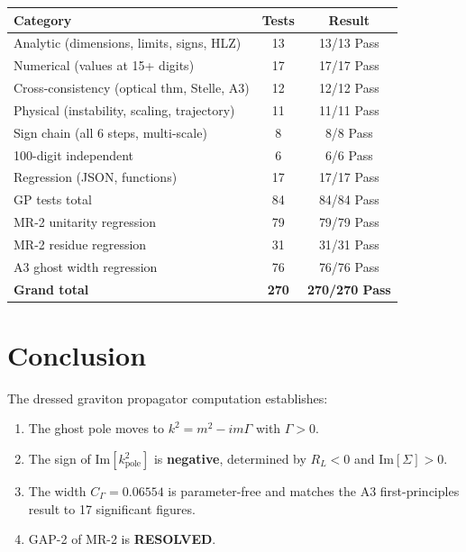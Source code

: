 \documentclass[11pt,a4paper]{article}
\newcommand{\Imag}{\mathrm{Im}}
\begin{document}
\begin{center}
\begin{tabular}{lcc}
\toprule
Category & Tests & Result \\
\midrule
Analytic (dimensions, limits, signs, HLZ) & 13 & 13/13 Pass \\
Numerical (values at 15+ digits) & 17 & 17/17 Pass \\
Cross-consistency (optical thm, Stelle, A3) & 12 & 12/12 Pass \\
Physical (instability, scaling, trajectory) & 11 & 11/11 Pass \\
Sign chain (all 6 steps, multi-scale) & 8 & 8/8 Pass \\
100-digit independent & 6 & 6/6 Pass \\
Regression (JSON, functions) & 17 & 17/17 Pass \\
\midrule
GP tests total & 84 & 84/84 Pass \\
MR-2 unitarity regression & 79 & 79/79 Pass \\
MR-2 residue regression & 31 & 31/31 Pass \\
A3 ghost width regression & 76 & 76/76 Pass \\
\midrule
\textbf{Grand total} & \textbf{270} & \textbf{270/270 Pass} \\
\bottomrule
\end{tabular}
\end{center}


\section{Conclusion}
\label{sec:conclusion}

The dressed graviton propagator computation establishes:
\begin{enumerate}
  \item The ghost pole moves to
    $k^2 = m^2 - im\Gamma$ with $\Gamma > 0$.
  \item The sign of $\Imag[k^2_{\mathrm{pole}}]$ is \textbf{negative},
    determined by $R_L < 0$ and $\Imag[\Sigma] > 0$.
  \item The width $C_\Gamma = 0.06554$ is parameter-free and matches
    the A3 first-principles result to 17 significant figures.
  \item GAP-2 of MR-2 is \textbf{RESOLVED}.
\end{enumerate}
\end{document}
